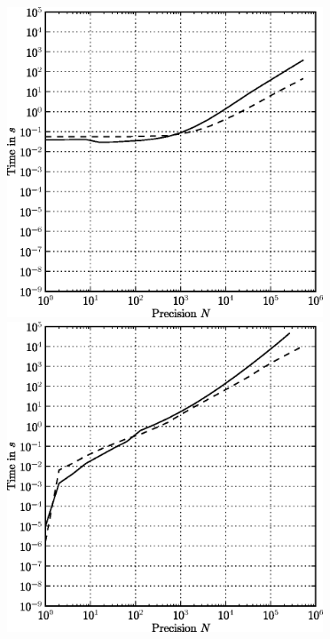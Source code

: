 \begin{figure}[ht]
\begin{minipage}[t]{0.5\linewidth}
\centering
\includegraphics[width=0.84\textwidth]{bin/qq-sqrt}
\end{minipage}
\begin{minipage}[t]{0.5\linewidth}
\centering
\includegraphics[width=0.84\textwidth]{bin/qq-teichmuller}
\end{minipage}\\


\end{figure}
